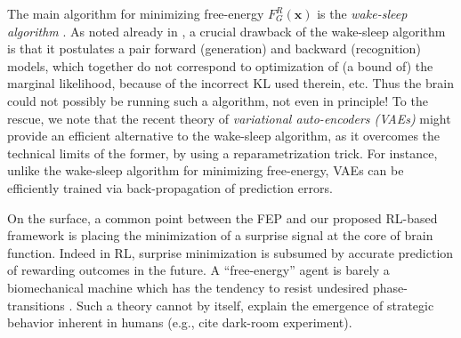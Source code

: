 \documentclass[10pt,letterpaper]{article}
\def\x{\mathbf{x}}
\begin{document}
The main algorithm for minimizing free-energy $F_G^R(\x)$ is the \textit{wake-sleep algorithm}
\citep{dayan1995helmholtz}. As noted already in \citep{dayan1995helmholtz},
a crucial drawback of the wake-sleep algorithm is that it postulates a pair forward (generation) and backward (recognition) models,
which together do not correspond to optimization of (a bound of) the marginal likelihood, because of the incorrect KL used therein, etc.
Thus the brain could not possibly be running such a algorithm, not even in principle! To the rescue, we note that the recent theory of
\textit{variational auto-encoders (VAEs)} \citep{kingma2013auto} might provide an efficient alternative to the wake-sleep algorithm,
as it overcomes the technical limits of the former, by using a reparametrization trick. For instance, unlike the wake-sleep algorithm
for minimizing free-energy, VAEs can be efficiently trained via back-propagation of prediction errors.

On the surface, a common point between the FEP and our proposed RL-based framework
  is placing the minimization of a surprise signal at the core of brain function.
  Indeed in RL, surprise minimization is subsumed  by accurate prediction of
  rewarding outcomes in the future. A ``free-energy'' agent is barely a biomechanical machine which has the tendency to resist undesired phase-transitions
  \citep{friston2010free,fristonAIorRL,ortega2013thermodynamics}. Such a theory cannot by itself,
  explain the emergence of strategic behavior inherent in humans (e.g.,  cite dark-room experiment).

\end{document}
